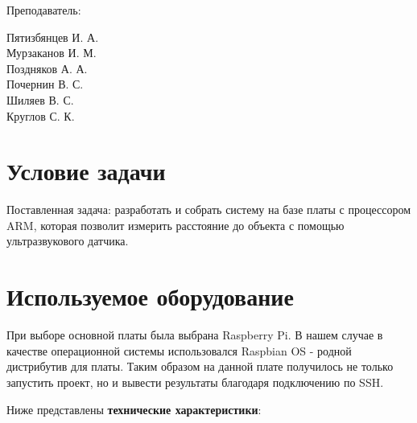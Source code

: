\documentclass[a4paper, 14pt]{article}
\begin{document}
\begin{titlepage}
\begin{multicols}{2}
\begin{flushright}
			{Преподаватель:\\}

		\end{flushright}
		\begin{flushright}

			{Пятизбянцев И. А.}\\
			{Мурзаканов И. М.}\\
			{Поздняков А. А.}\\
			{Почернин В. С.}\\
			{Шиляев В. С.}\\[0.5cm]


			Круглов С. К.\\

		\end{flushright}
	\end{multicols}

	\flushright{
	{\phantom{qwe}}\\[1.5cm]
	{\today}\\
	}

	\vfill
\end{titlepage}

\Large
\tableofcontents
\newpage

\section{Условие задачи}

Поставленная задача: разработать и собрать систему на базе платы с процессором ARM, которая позволит измерить расстояние до объекта с помощью ультразвукового датчика.

\newpage
\section{Используемое оборудование}

При выборе основной платы была выбрана Raspberry Pi. В нашем случае в качестве операционной системы использовался Raspbian OS - родной дистрибутив для платы. Таким образом на данной плате получилось не только запустить проект, но и вывести результаты благодаря подключению по SSH.

Ниже представлены \textbf{технические характеристики}:
\end{document}
